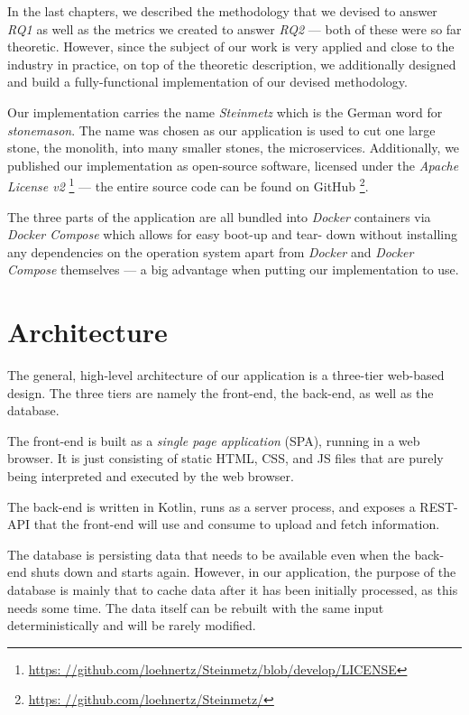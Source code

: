 \documentclass[12pt,a4paper]{report}
\begin{document}
In the last chapters, we described the methodology that we devised to answer
\textit{RQ1} as well as the metrics we created to answer \textit{RQ2} --- both
of these were so far theoretic. However, since the subject of our work is very
applied and close to the industry in practice, on top of the theoretic
description, we additionally designed and build a fully-functional
implementation of our devised methodology.

Our implementation carries the name \textit{Steinmetz} which is the German word
for \textit{stonemason}. The name was chosen as our application is used to cut
one large stone, the monolith, into many smaller stones, the microservices.
Additionally, we published our implementation as open-source software, licensed
under the \textit{Apache License v2} \footnote{\url{https:
//github.com/loehnertz/Steinmetz/blob/develop/LICENSE}} --- the entire source
code can be found on GitHub \footnote{\url{https:
//github.com/loehnertz/Steinmetz/}}.

The three parts of the application are all bundled into \textit{Docker}
containers via \textit{Docker Compose} which allows for easy boot-up and tear\hyp
down without installing any dependencies on the operation system apart from
\textit{Docker} and \textit{Docker Compose} themselves \cite{docker, docker-compose}
--- a big advantage when putting our implementation to use.



\section{Architecture}
The general, high-level architecture of our application
is a three-tier web-based design. The three tiers are namely the front-end, the
back-end, as well as the database.

The front-end is built as a \textit{single page application} (SPA), running in
a web browser. It is just consisting of static HTML, CSS, and JS files that are
purely being interpreted and executed by the web browser.

The back-end is written in Kotlin, runs as a server process, and exposes a REST\hyp
API that the front-end will use and consume to upload and fetch information.

The database is persisting data that needs to be available even when the back\hyp
end shuts down and starts again. However, in our application, the purpose of
the database is mainly that to cache data after it has been initially
processed, as this needs some time. The data itself can be rebuilt with the
same input deterministically and will be rarely modified.
\end{document}
